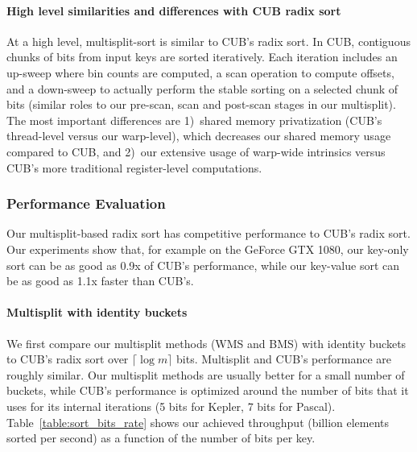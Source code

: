 \paragraph{High level similarities and differences with CUB radix sort}
At a high level, multisplit-sort is similar to CUB's radix sort.
In CUB, contiguous chunks of bits from input keys are sorted iteratively. Each iteration includes an up-sweep where bin counts are computed, a scan operation to compute offsets, and a down-sweep to actually perform the stable sorting on a selected chunk of bits (similar roles to our pre-scan, scan and post-scan stages in our multisplit).
The most important differences are 1)~shared memory privatization (CUB's thread-level versus our warp-level), which decreases our shared memory usage compared to CUB, and 2)~our extensive usage of warp-wide intrinsics versus CUB's more traditional register-level computations.

\subsubsection{Performance Evaluation}
Our multisplit-based radix sort has competitive performance to CUB's radix sort. Our experiments show that, for example on the GeForce GTX 1080, our key-only sort can be as good as 0.9x of CUB's performance, while our key-value sort can be as good as 1.1x faster than CUB's.

\paragraph{Multisplit with identity buckets}
We first compare our multisplit methods (WMS and BMS) with identity buckets to  CUB's radix sort over $\lceil \log m \rceil$ bits.
Multisplit and CUB's performance are roughly similar.
Our multisplit methods are usually better for a small number of buckets, while CUB's performance is optimized around the number of bits that it uses for its internal iterations (5 bits for Kepler, 7 bits for Pascal).
Table~\ref{table:sort_bits_rate} shows our achieved throughput (billion elements sorted per second) as a function of the number of bits per key.


